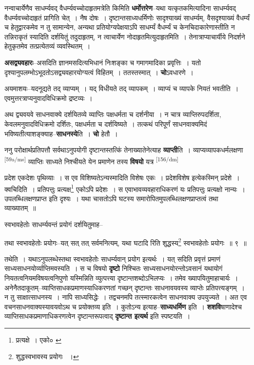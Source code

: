 \documentclass[article,12pt,a4paper]{memoir}
\begin{document}
	  \pstart नन्वाचार्येणैव साधर्म्यवद् वैधर्म्यवच्चोदाहृतमत्रेति किमिति \textbf{धर्मोत्तरेण}--यथा यत्कृतकमित्यादिना साधर्म्यवद् वैधर्म्यवच्चोदाहृतं प्रागिति चेत् । नैष दोषः । दृष्टान्तसाध्यधर्मिणोः सादृश्याख्यं साधर्म्यम्, वैसदृश्याख्यं वैधर्म्यं च हेतुद्वारकमेव न तु सामान्येन, अन्यथा प्रतियोग्यपेक्षयाऽपि साधर्म्यं वैधर्म्यं च केनचिदाकारेणास्तीति न तन्निराकृतं स्यादिति दर्शयितुं तदुदाहृतम्, न त्वाचार्येण नोदाहृतमित्युदाहृतमिति । तेनात्राप्याचार्यीये निदर्शने हेतुकृतमेव तत्प्रत्येतव्यं व्यवस्थितम् ।
	\pend
      

	  \pstart \textbf{असद्व्यवहारः}--असदिति ज्ञानमसदित्यभिधानं निःशङ्का च गमागमादिका प्रवृत्तिः । यतो दृश्यानुपलम्भोऽभूदतोऽसद्व्यवहारयोग्यत्वं विहितम् । ततस्तस्मात् । \textbf{चो}ऽवधारणे ।
	\pend
      

	  \pstart अयमाशयः--यदनूद्यते तद् व्याप्यम् । यद् विधीयते तद् व्यापकम् । व्याप्यं च व्यापके नियतं भवतीति । एवमुत्तरत्राप्यनुवादविधिक्रमो द्रष्टव्यः ।
	\pend
      

	  \pstart अथ द्व्यवयवे साधनवाक्ये दर्शयितव्ये व्याप्तिः पक्षधर्मता च दर्शनीया । न चात्र व्याप्तिरुपदर्शिता, केवलमनुवादविधिक्रमो दर्शितः, पक्षधर्मता च दर्शयिष्यते । तत्कथं परिपूर्णं साधनवाक्यमिदं भविष्यतीत्याशङ्क्याह--\textbf{साधनस्ये}ति । \textbf{चो} हेतौ ।
	\pend
      

	  \pstart ननु परोक्षार्थप्रतिपत्तौ सर्वथाऽनुपयोगी दृष्टान्तस्तत्किं तेनाख्यातेनेत्याह \textbf{व्याप्ती}ति । व्याप्यव्यापकधर्मलक्षणा \leavevmode\textsuperscript{\rmlatinfont\tiny [59a/ms]} व्याप्तिः साध्यते निश्चीयते येन प्रमाणेन तस्य \textbf{विषयो} यत्र  \leavevmode\textsuperscript{\rmlatinfont\tiny [156/dm]} 
	  
	प्रदेश एकदेशः पृथिव्याः । स एव विशिष्यतेऽन्यस्मादिति विशेषः एकः । प्रदेशविशेष इत्येकस्मिन् प्रदेशे । क्वचिदिति । प्रतिपत्तुः प्रत्यक्ष\footnote{प्रत्यक्षे । एको० \cite{dp-msC} \cite{dp-msD} \cite{dp-edE} \cite{dp-edN}} एकोऽपि प्रदेशः । स एवाभावव्यवहाराधिकरणं यः प्रतिपत्तुः प्रत्यक्षो नान्यः । उपलब्धिलक्षणप्राप्त इति दृश्यः । यथा चासतोऽपि घटस्य समारोपितमुपलब्धिलक्षणप्राप्तत्वं तथा व्याख्यातम् ॥ 
	  
	स्वभावहेतोः साधर्म्यवन्तं प्रयोगं दर्शयितुमाह-- 
	  
	तथा स्वभावहेतोः प्रयोगः--यत् सत् तत् सर्वमनित्यम्, यथा घटादि रिति शुद्धस्य\footnote{शुद्धस्वभावस्य प्रयोगः \cite{dp-msC} ।} स्वभावहेतोः प्रयोगः ॥ ९ ॥ 
	  
	तथेति । यथाऽनुपलब्धेस्तथा स्वभावहेतोः साधर्म्यवान् प्रयोग इत्यर्थः । यत् सदिति प्रवृत्तं प्रमाणं साध्यसाधनयोर्व्याप्तिमवस्यति । स च विषयो \textbf{दृष्टो} निश्चितः साध्यसाधनयोरन्तोऽवसानं यथायोगं नियतत्वनियमविषयत्वनिपुणो यस्मिन्निति व्युत्पत्त्या दृष्टान्तशब्दोऽभिलप्यः । तमेव ख्यापयितुमाहाचार्यः । अनेनैतदाकूतम्--व्याप्तिसाधकप्रमाणस्याधिकरणतां गच्छन् दृष्टान्तः साधनावयवस्य व्याप्तेः प्रतिपत्त्यङ्गम् । न तु साक्षात्साधनस्य । नापि साध्यसिद्धेः । तद्वचनमपि तत्स्मारकत्वेन साधनवाक्य उपयुज्यते । अत एव वचनसाधनवाक्यस्यावयवोऽथ च प्रयोक्तव्य इति । कुतोऽन्य इत्याह--\textbf{साध्यधर्मिण} इति । \textbf{शशवि}षाणादेश्च व्याप्तिसाधकप्रमाणाधिकरणत्वेन दृष्टान्तरूपत्वाद् \textbf{दृष्टान्त इत्यर्थ} इति स्पष्टयति ।
	\pend
      
\end{document}
